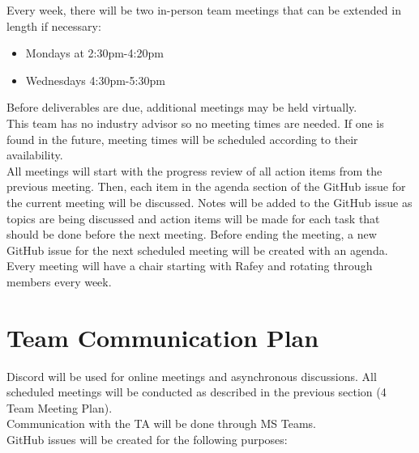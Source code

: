 \documentclass{article}
\begin{document}
Every week, there will be two in-person team meetings that can be extended in length if necessary:
\begin{itemize}
    \item Mondays at 2:30pm-4:20pm
    \item Wednesdays 4:30pm-5:30pm
\end{itemize}

Before deliverables are due, additional meetings may be held virtually. \\

This team has no industry advisor so no meeting times are needed. If one is found in the future, meeting times will be scheduled according to their availability. \\

All meetings will start with the progress review of all action items from the previous meeting. Then, each item in the agenda section of the GitHub issue for the current meeting will be discussed. Notes will be added to the GitHub issue as topics are being discussed and action items will be made for each task that should be done before the next meeting. Before ending the meeting, a new GitHub issue for the next scheduled meeting will be created with an agenda. \\

Every meeting will have a chair starting with Rafey and rotating through members every week.

\pagebreak

\section{Team Communication Plan} \label{team_communication_plan}

Discord will be used for online meetings and asynchronous discussions. All scheduled meetings will be conducted as described in the previous section (4 Team Meeting Plan). \\

Communication with the TA will be done through MS Teams. \\

GitHub issues will be created for the following purposes:
\end{document}
